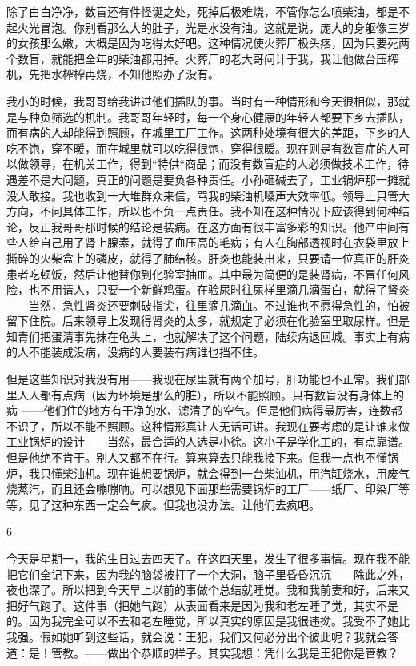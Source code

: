 除了白白净净，数盲还有件怪诞之处，死掉后极难烧，不管你怎么喷柴油，都是不起火光冒泡。你别看那么大的肚子，光是水没有油。这就是说，庞大的身躯像三岁的女孩那么嫩，大概是因为吃得太好吧。这种情况使火葬厂极头疼，因为只要死两个数盲，就能把全年的柴油都用掉。火葬厂的老大哥问计于我，我让他做台压榨机，先把水榨榨再烧，不知他照办了没有。 



我小的时候，我哥哥给我讲过他们插队的事。当时有一种情形和今天很相似，那就是与种负筛选的机制。我哥哥年轻时，每一个身心健康的年轻人都要下乡去插队，而有病的人却能得到照顾，在城里工厂工作。这两种处境有很大的差距，下乡的人吃不饱，穿不暖，而在城里就可以吃得很饱，穿得很暖。现在则是有数盲症的人可以做领导，在机关工作，得到“特供“商品；而没有数盲症的人必须做技术工作，待遇差不是大问题，真正的问题是要负各种责任。小孙砸碱去了，工业锅炉那一摊就没人敢接。我也收到一大堆群众来信，骂我的柴油机嗓声大效率低。领导上只管大方向，不问具体工作，所以也不负一点责任。我不知在这种情况下应该得到何种结论，反正我哥哥那时候的结论是装病。在这方面有很丰富多彩的知识。他产中间有些人给自己用了肾上腺素，就得了血压高的毛病；有人在胸部透视时在衣袋里放上撕碎的火柴盒上的磷皮，就得了肺结核。肝炎也能装出来，只要请一位真正的肝炎患者吃顿饭，然后让他替你到化验室抽血。其中最为简便的是装肾病，不冒任何风险，也不用请人，只要一个新鲜鸡蛋。在验尿时往尿样里滴几滴蛋白，就得了肾炎——当然，急性肾炎还要刺破指尖，往里滴几滴血。不过谁也不愿得急性的，怕被留下住院。后来领导上发现得肾炎的太多，就规定了必须在化验室里取尿样。但是知青们把蛋清事先抹在龟头上，也就解决了这个问题，陆续病退回城。事实上有病的人不能装成没病，没病的人要装有病谁也挡不住。 

但是这些知识对我没有用——我现在尿里就有两个加号，肝功能也不正常。我们部里人人都有点病（因为环境是那么的脏），所以不能照顾。只有数盲没有身体上的病 ——他们住的地方有干净的水、滤清了的空气。但是他们病得最厉害，连数都不识了，所以不能不照顾。这种情形真让人无话可讲。我现在要考虑的是让谁来做工业锅炉的设计——当然，最合适的人选是小徐。这小子是学化工的，有点靠谱。但是他绝不肯干。别人又都不在行。算来算去只能我接下来。但我一点也不懂锅炉，我只懂柴油机。现在谁想要锅炉，就会得到一台柴油机，用汽缸烧水，用废气烧蒸汽，而且还会嘣嘣响。可以想见下面那些需要锅炉的工厂——纸厂、印染厂等等，见了这种东西一定会气疯。但我也没办法。让他们去疯吧。 



6 

今天是星期一，我的生日过去四天了。在这四天里，发生了很多事情。现在我不能把它们全记下来，因为我的脑袋被打了一个大洞，脑子里昏昏沉沉——除此之外，夜也深了。所以把到今天早上以前的事做个总结就睡觉。我和我前妻和好，后来又把好气跑了。这件事（把她气跑）从表面看来是因为我和老左睡了觉，其实不是的。因为我完全可以不去和老左睡觉，所以真实的原因是我很违拗。我受不了她比我强。假如她听到这些话，就会说：王犯，我们又何必分出个彼此呢？我就会答道：是！管教。——做出个恭顺的样子。其实我想：凭什么我是王犯你是管教？

